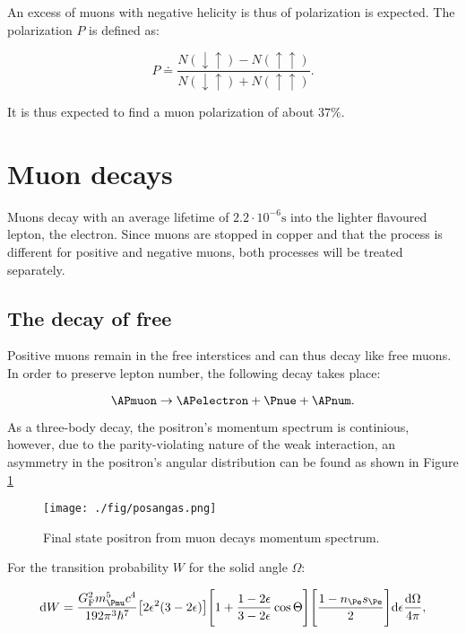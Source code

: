 An excess of muons with negative helicity is thus of polarization is expected. The polarization $P$ is defined as:

\begin{equation}
P\doteq \frac{N(\downarrow\uparrow)-N(\uparrow\uparrow)}{N(\downarrow\uparrow)+N(\uparrow\uparrow)}.
\end{equation}

It is thus expected to find a muon polarization of about $37\%$.

\section{Muon decays}

Muons decay with an average lifetime of $2.2 \cdot 10^{-6}\si{\second}$ into the lighter flavoured lepton, the electron. Since muons are stopped in copper and that the process is different for positive and negative muons, both processes will be treated separately.

\subsection{The decay of free \APmuon}

Positive muons remain in the free interstices and can thus decay like free muons. In order to preserve lepton number, the following decay takes place:

\begin{equation*}
\APmuon \rightarrow \APelectron + \Pnue + \APnum.
\end{equation*}

As a three-body decay, the positron's momentum spectrum is continious, however, due to the parity-violating nature of the weak interaction, an asymmetry in the positron's angular distribution can be found as shown in Figure \ref{fig:angassy}

\begin{figure}
\centering
\texttt{[image: ./fig/posangas.png]}
\caption{Final state positron from muon decays momentum spectrum.}
\label{fig:angassy}
\end{figure}

For the transition probability $W$ for the solid angle $\Omega$:

\begin{equation}
\label{eq:e413}
\mathrm{d}W=\frac{G_{\text{F}}^2m_{\Pmu}^5c^4}{192\pi^3\hbar^7}\big[2\epsilon^2(3-2\epsilon) \big] \Bigg[1+\frac{1-2\epsilon}{3-2\epsilon} \cos{\Theta} \Bigg] \Bigg[ \frac{1-n_{\Pe}s_{\Pe}}{2}\Bigg]\mathrm{d}\epsilon \frac{\mathrm{d}\Omega}{4\pi},
\end{equation}

